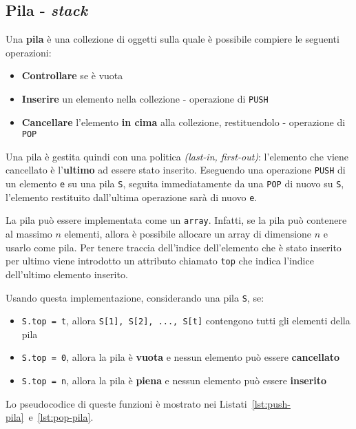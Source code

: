 \documentclass[italian, 10pt]{article}
\begin{document}
\subsection{Pila - \textit{stack}}

Una \textbf{pila} è una collezione di oggetti sulla quale è possibile compiere le seguenti operazioni:

\begin{itemize}
  \item \textbf{Controllare} se è vuota
  \item \textbf{Inserire} un elemento nella collezione - operazione di \texttt{PUSH}
  \item \textbf{Cancellare} l'elemento \textbf{in cima} alla collezione, restituendolo - operazione di \texttt{POP}
\end{itemize}

Una pila è gestita quindi con una politica \LIFO \textit{(last-in, first-out)}: l'elemento che viene cancellato è l'\textbf{ultimo} ad essere stato inserito.
Eseguendo una operazione \texttt{PUSH} di un elemento \texttt{e} su una pila \texttt{S}, seguita immediatamente da una \texttt{POP} di nuovo su \texttt{S}, l'elemento restituito dall'ultima operazione sarà di nuovo \texttt{e}.

\bigskip
La pila può essere implementata come un \texttt{array}.
Infatti, se la pila può contenere al massimo \(n\) elementi, allora è possibile allocare un array di dimensione \(n\) e usarlo come pila.
Per tenere traccia dell'indice dell'elemento che è stato inserito per ultimo viene introdotto un attributo chiamato \texttt{top} che indica l'indice dell'ultimo elemento inserito.

Usando questa implementazione, considerando una pila \texttt{S}, se:

\begin{itemize}
  \item \texttt{S.top = t}, allora \texttt{S[1], S[2], ..., S[t]} contengono tutti gli elementi della pila
  \item \texttt{S.top = 0}, allora la pila è \textbf{vuota} e nessun elemento può essere \textbf{cancellato}
  \item \texttt{S.top = n}, allora la pila è \textbf{piena} e nessun elemento può essere \textbf{inserito}
\end{itemize}

\bigskip
Lo pseudocodice di queste funzioni è mostrato nei Listati~\ref{lst:push-pila}~e~\ref{lst:pop-pila}.
\end{document}
